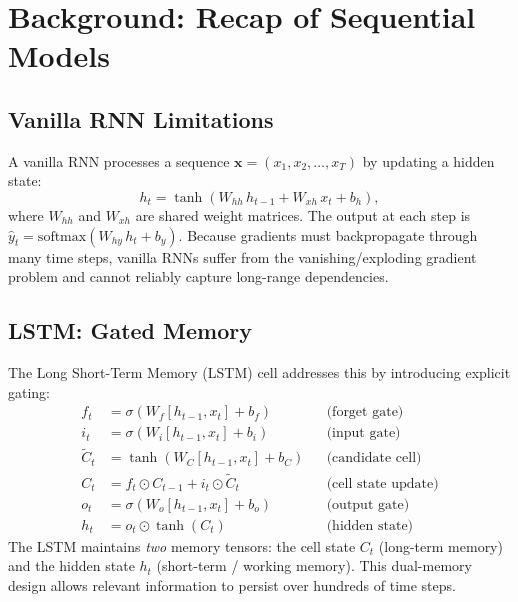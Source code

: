 \documentclass[12pt,a4paper]{article}
\begin{document}
\section{Background: Recap of Sequential Models}
\label{sec:background}

\subsection{Vanilla RNN Limitations}

A vanilla RNN processes a sequence $\mathbf{x} = (x_1, x_2, \ldots, x_T)$ by updating a hidden
state:
\begin{equation}
  h_t = \tanh\!\left(W_{hh}\,h_{t-1} + W_{xh}\,x_t + b_h\right),
  \label{eq:rnn_hidden}
\end{equation}
where $W_{hh}$ and $W_{xh}$ are shared weight matrices. The output at each step is
$\hat{y}_t = \text{softmax}(W_{hy}\,h_t + b_y)$. Because gradients must backpropagate through
many time steps, vanilla RNNs suffer from the vanishing/exploding gradient problem and cannot
reliably capture long-range dependencies.

\subsection{LSTM: Gated Memory}

The Long Short-Term Memory (LSTM) cell addresses this by introducing explicit gating:
\begin{align}
  f_t &= \sigma\!\left(W_f [h_{t-1}, x_t] + b_f\right) & &\text{(forget gate)} \label{eq:lstm_f}\\
  i_t &= \sigma\!\left(W_i [h_{t-1}, x_t] + b_i\right) & &\text{(input gate)} \label{eq:lstm_i}\\
  \tilde{C}_t &= \tanh\!\left(W_C [h_{t-1}, x_t] + b_C\right) & &\text{(candidate cell)} \label{eq:lstm_cc}\\
  C_t &= f_t \odot C_{t-1} + i_t \odot \tilde{C}_t & &\text{(cell state update)} \label{eq:lstm_c}\\
  o_t &= \sigma\!\left(W_o [h_{t-1}, x_t] + b_o\right) & &\text{(output gate)} \label{eq:lstm_o}\\
  h_t &= o_t \odot \tanh(C_t) & &\text{(hidden state)} \label{eq:lstm_h}
\end{align}
The LSTM maintains \emph{two} memory tensors: the cell state $C_t$ (long-term memory) and the
hidden state $h_t$ (short-term / working memory). This dual-memory design allows relevant
information to persist over hundreds of time steps.
\end{document}
